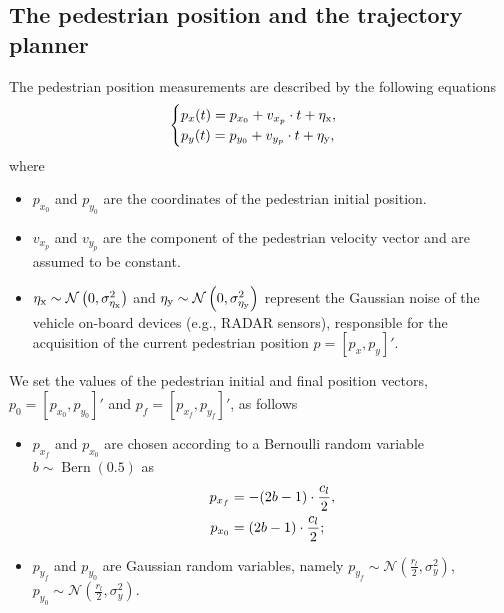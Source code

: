 \subsection{The pedestrian position and the trajectory planner}
\label{sub_sec:3-b}
The pedestrian position measurements are described by the following equations
\begin{equation}
\begin{cases} p_x(t)=p_{x_0}+v_{x_p}\cdot t+\eta_{ \rm x}, \\ p_y(t)=p_{y_0}+v_{y_p}\cdot t +\eta_{\rm y},
\end{cases} 
\end{equation}
where
\begin{itemize}
\item $p_{x_0}$ and $p_{y_0}$ are the  coordinates of the pedestrian initial position. 
\item $v_{x_p}$ and $v_{y_p}$ are the component of the pedestrian velocity vector and are assumed to be constant.
\item $\eta_{\rm x} \sim \mathcal{N}\left(0, \sigma_{\rm \eta_x}^{2}\right)$ and $ \eta_{\rm y} \sim \mathcal{N}\left(0, \sigma_{\rm \eta_y}^{2}\right)$ represent the Gaussian noise of the vehicle on-board devices (e.g., RADAR sensors), responsible for the acquisition of the current pedestrian position $p = [p_x, p_y]'$. 
\end{itemize}

We set the values of the pedestrian initial and final position vectors, $p_0=[p_{x_0}, p_{y_0}]'$ and $p_f=[p_{x_f}, p_{y_f}]'$, as follows
\begin{itemize}
\item $p_{x_f} $ and $p_{x_0}$ are chosen according to a Bernoulli random variable $b \sim \operatorname{Bern}(0.5)$ as
\begin{equation}
	\centering   
	\begin{aligned}
		p_{x_f} & =-(2b-1)\cdot\frac{c_l}{2}, \\
		p_{x_0} & =(2b-1)\cdot\frac{c_l}{2};
	\end{aligned}
\end{equation}
\item $p_{y_f} $ and $p_{y_0}$ are Gaussian random variables, namely $p_{y_f} \sim \mathcal{N}\left(\frac{r_l}{2}, \sigma_{y}^2\right)$, $p_{y_0} \sim \mathcal{N}\left(\frac{r_l}{2},\sigma_{y}^2\right)$.
\end{itemize}

